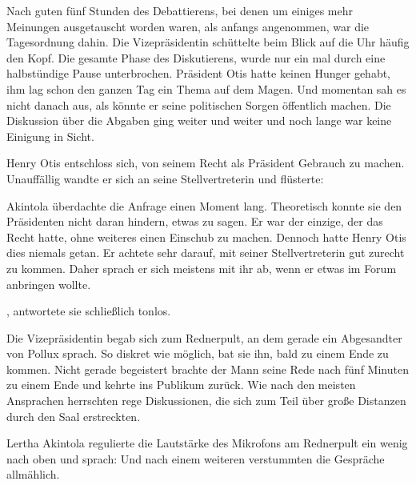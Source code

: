\par

Nach guten fünf Stunden des Debattierens, bei denen um einiges mehr Meinungen ausgetauscht worden waren, als anfangs angenommen, war die Tagesordnung dahin.
Die Vizepräsidentin schüttelte beim Blick auf die Uhr häufig den Kopf.
Die gesamte Phase des Diskutierens, wurde nur ein mal durch eine halbstündige Pause unterbrochen.
Präsident Otis hatte keinen Hunger gehabt, ihm lag schon den ganzen Tag ein Thema auf dem Magen.
Und momentan sah es nicht danach aus, als könnte er seine politischen Sorgen öffentlich machen.
Die Diskussion über die Abgaben ging weiter und weiter und noch lange war keine Einigung in Sicht.

\par

Henry Otis entschloss sich, von seinem Recht als Präsident Gebrauch zu machen.
Unauffällig wandte er sich an seine Stellvertreterin und flüsterte:

\par

Akintola überdachte die Anfrage einen Moment lang.
Theoretisch konnte sie den Präsidenten nicht daran hindern, etwas zu sagen.
Er war der einzige, der das Recht hatte, ohne weiteres einen Einschub zu machen.
Dennoch hatte Henry Otis dies niemals getan.
Er achtete sehr darauf, mit seiner Stellvertreterin gut zurecht zu kommen.
Daher sprach er sich meistens mit ihr ab, wenn er etwas im Forum anbringen wollte.

\par

, antwortete sie schließlich tonlos.

\par

Die Vizepräsidentin begab sich zum Rednerpult, an dem gerade ein Abgesandter von Pollux sprach.
So diskret wie möglich, bat sie ihn, bald zu einem Ende zu kommen.
Nicht gerade begeistert brachte der Mann seine Rede nach fünf Minuten zu einem Ende und kehrte ins Publikum zurück.
Wie nach den meisten Ansprachen herrschten rege Diskussionen, die sich zum Teil über große Distanzen durch den Saal erstreckten.

\par

Lertha Akintola regulierte die Lautstärke des Mikrofons am Rednerpult ein wenig nach oben und sprach:
Und nach einem weiteren  verstummten die Gespräche allmählich.


